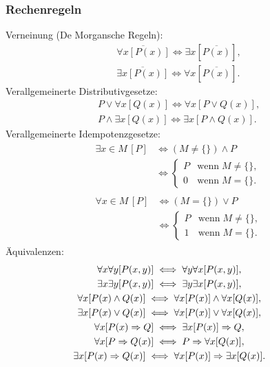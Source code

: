 \subsubsection{Rechenregeln}
Verneinung (De Morgansche Regeln):
\begin{gather}
\overline{\forall x[P(x)]}\iff \exists x[\overline{P(x)}],\\
\overline{\exists x[P(x)]}\iff \forall x[\overline{P(x)}].
\end{gather}
Verallgemeinerte Distributivgesetze:
\begin{gather}
P\lor\forall x[Q(x)] \iff \forall x[P\lor Q(x)],\\
P\land\exists x[Q(x)] \iff \exists x[P\land Q(x)].
\end{gather}
Verallgemeinerte Idempotenzgesetze:
\begin{gather}
\begin{split}
\exists x{\in}M\,[P] & \iff
(M\ne\{\})\land P\\
& \iff\begin{cases}
P & \text{wenn}\; M\ne\{\},\\
0 & \text{wenn}\; M=\{\}.
\end{cases}
\end{split}\\
\begin{split}
\forall x{\in}M\,[P]& \iff
(M=\{\})\lor P\\
&\iff\begin{cases}
P & \text{wenn}\; M\ne\{\},\\
1 & \text{wenn}\; M=\{\}.
\end{cases}
\end{split}
\end{gather}
Äquivalenzen:
\begin{gather}
\hspace{-2em}\forall x\forall y[P(x,y)] \iff \forall y\forall x[P(x,y)],\\
\hspace{-2em}\exists x\exists y[P(x,y)] \iff \exists y\exists x[P(x,y)],\\
\hspace{-2em}\forall x[P(x)\land Q(x)] \iff \forall x[P(x)]\land\forall x[Q(x)],\\
\hspace{-2em}\exists x[P(x)\lor Q(x)] \iff \forall x[P(x)]\lor\forall x[Q(x)],\\
\hspace{-2em}\forall x[P(x)\Rightarrow Q] \iff \exists x[P(x)]\Rightarrow Q,\\
\hspace{-2em}\forall x[P\Rightarrow Q(x)] \iff P\Rightarrow\forall x[Q(x)],\\
\hspace{-2em}\exists x[P(x)\Rightarrow Q(x)]
  \iff\forall x[P(x)]\Rightarrow\exists x[Q(x)].
\end{gather}
